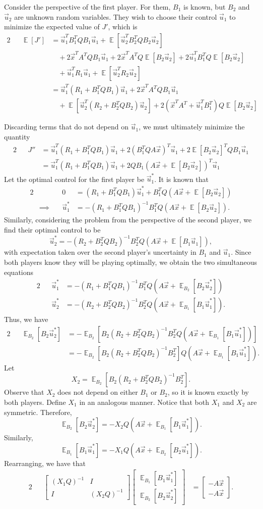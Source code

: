 \documentclass[letterpaper]{article}
\theoremstyle{remark}
\DeclareMathOperator{\EX}{\mathbb{E}}%
\newcommand{\mat}[1]{\ensuremath{\begin{bmatrix}#1\end{bmatrix}}}
\newcommand{\eqn}[1]{\begin{alignat*}{2}#1\end{alignat*}}
\newcommand*{\thus}{&\implies\quad&}
\begin{document}
Consider the perspective of the first player. For them, $B_1$ is known, but $B_2$ and $\vec{u}_2$ are unknown random variables. They wish to choose their control $\vec{u}_1$ to minimize the expected value of $J'$, which is
\eqn{
    && \EX[J'] &= \vec{u}_1^TB_1^TQB_1\vec{u}_1 + \EX[\vec{u}_2^TB_2^TQB_2\vec{u}_2] \\ 
    &&&\quad + 2\vec{x}^TA^TQB_1\vec{u}_1 + 2\vec{x}^TA^TQ\EX[B_2\vec{u}_2] + 2\vec{u}_1^TB_1^TQ\EX[B_2\vec{u}_2] \\
    &&&\quad + \vec{u}_1^TR_1\vec{u}_1 + \EX[\vec{u}_2^TR_2\vec{u}_2] \\
    &&&= \vec{u}_1^T(R_1 + B_1^TQB_1)\vec{u}_1 + 2\vec{x}^TA^TQB_1\vec{u}_1 \\
    &&&\quad + \EX[\vec{u}_2^T(R_2 + B_2^TQB_2)\vec{u}_2] + 2(\vec{x}^TA^T + \vec{u}_1^TB_1^T)Q\EX[B_2\vec{u}_2] 
}

Discarding terms that do not depend on $\vec{u}_1$, we must ultimately minimize the quantity
\eqn{
    && J'' &= \vec{u}_1^T(R_1 + B_1^TQB_1)\vec{u}_1 + 2(B_1^TQA\vec{x})^T\vec{u}_1 + 2\EX[B_2\vec{u}_2]^TQB_1\vec{u}_1 \\
    &&&= \vec{u}_1^T(R_1 + B_1^TQB_1)\vec{u}_1 + 2QB_1(A\vec{x} + \EX[B_2\vec{u}_2])^T \vec{u}_1
}
Let the optimal control for the first player be $\vec{u}_1^*$. It is known that
\eqn{
    && 0 &= (R_1 + B_1^TQB_1)\vec{u}_1^* + B_1^TQ(A\vec{x} + \EX[B_2\vec{u}_2]) \\
    \thus \vec{u}_1^* &= -(R_1 + B_1^TQB_1)^{-1}B_1^TQ(A\vec{x} + \EX[B_2\vec{u}_2]).
}
Similarly, considering the problem from the perspective of the second player, we find their optimal control to be
\[
    \vec{u}_2^* = -(R_2 + B_2^TQB_2)^{-1}B_2^TQ(A\vec{x} + \EX[B_1\vec{u}_1]),
\]
with expectation taken over the second player's uncertainty in $B_1$ and $\vec{u}_1$. Since both players know they will be playing optimally, we obtain the two simultaneous equations
\eqn{
    && \vec{u}_1^* &= -(R_1 + B_1^TQB_1)^{-1}B_1^TQ(A\vec{x} + \EX_{B_2}[B_2\vec{u}_2^*]) \\
    && \vec{u}_2^* &= -(R_2 + B_2^TQB_2)^{-1}B_2^TQ(A\vec{x} + \EX_{B_1}[B_1\vec{u}_1^*]).
}
Thus, we have
\eqn{
    && \EX_{B_2}[B_2\vec{u}_2^*] &= -\EX_{B_2}[B_2(R_2 + B_2^TQB_2)^{-1}B_2^TQ(A\vec{x} + \EX_{B_1}[B_1\vec{u}_1^*])] \\
    &&&= -\EX_{B_2}[B_2(R_2 + B_2^TQB_2)^{-1}B_2^T]Q(A\vec{x} + \EX_{B_1}[B_1\vec{u}_1^*]).
}
Let
\[
    X_2 = \EX_{B_2}[B_2(R_2 + B_2^TQB_2)^{-1}B_2^T].
\]
Observe that $X_2$ does not depend on either $B_1$ or $B_2$, so it is known exactly by both players. Define $X_1$ in an analogous manner. Notice that both $X_1$ and $X_2$ are symmetric. Therefore,
\[
    \EX_{B_2}[B_2\vec{u}_2^*] = -X_2Q(A\vec{x} + \EX_{B_1}[B_1\vec{u}_1^*]).
\]
Similarly,
\[
    \EX_{B_1}[B_1\vec{u}_1^*] = -X_1Q(A\vec{x} + \EX_{B_2}[B_2\vec{u}_1^*]).
\]
Rearranging, we have that 
\eqn{
    && \mat{(X_1Q)^{-1} & I \\ I & (X_2Q)^{-1}} \mat{\EX_{B_1}[B_1\vec{u}_1^*] \\ \EX_{B_2}[B_2\vec{u}_2^*]} &= \mat{-A\vec{x} \\ -A\vec{x}}.
}
\end{document}
